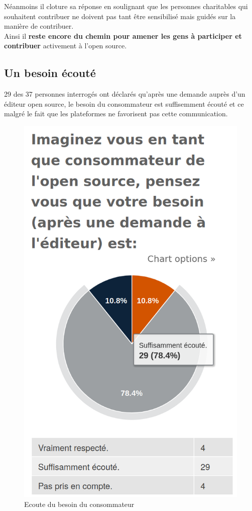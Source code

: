 			Néanmoins il cloture sa réponse en soulignant que les personnes charitables qui souhaitent contribuer ne doivent pas tant être sensibilisé mais guidés sur la manière de contribuer.\\

			Ainsi il \textbf{reste encore du chemin pour amener les gens à participer et contribuer} activement à l'open source.

		\subsection{Un besoin écouté}

			29 des 37 personnes interrogés ont déclarés qu'après une demande auprès d'un éditeur open source, le besoin du consommateur est suffisemment écouté et ce malgré le fait que les plateformes ne favorisent pas cette communication.

			\begin{figure}[!htb]
				\center
				\includegraphics[scale=0.28]{./img/a12}
				\caption{Ecoute du besoin du consommateur}
			\end{figure}

